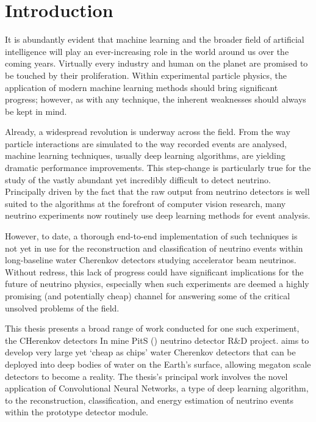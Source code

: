 \chapter{Introduction} %
\label{chap:introduction} %
\setcounter{page}{17}  %

It is abundantly evident that machine learning and the broader field of artificial intelligence
will play an ever-increasing role in the world around us over the coming years. Virtually every
industry and human on the planet are promised to be touched by their proliferation. Within
experimental particle physics, the application of modern machine learning methods should bring
significant progress; however, as with any technique, the inherent weaknesses should always be
kept in mind.

Already, a widespread revolution is underway across the field. From the way particle interactions
are simulated to the way recorded events are analysed, machine learning techniques, usually deep
learning algorithms, are yielding dramatic performance improvements. This step-change is
particularly true for the study of the vastly abundant yet incredibly difficult to detect
neutrino. Principally driven by the fact that the raw output from neutrino detectors is well
suited to the algorithms at the forefront of computer vision research, many neutrino experiments
now routinely use deep learning methods for event analysis.

However, to date, a thorough end-to-end implementation of such techniques is not yet in use for
the reconstruction and classification of neutrino events within long-baseline water Cherenkov
detectors studying accelerator beam neutrinos. Without redress, this lack of progress could have
significant implications for the future of neutrino physics, especially when such experiments are
deemed a highly promising (and potentially cheap) channel for answering some of the critical
unsolved problems of the field.

This thesis presents a broad range of work conducted for one such experiment, the CHerenkov
detectors In mine PitS (\chips) neutrino detector R\&D project. \chips aims to develop very large
yet `cheap as chips' water Cherenkov detectors that can be deployed into deep bodies of water on
the Earth's surface, allowing megaton scale detectors to become a reality. The thesis's principal
work involves the novel application of Convolutional Neural Networks, a type of deep learning
algorithm, to the reconstruction, classification, and energy estimation of neutrino events within
the \chipsfive prototype detector module.

